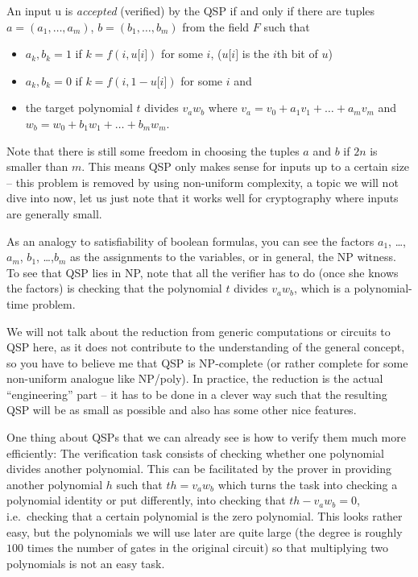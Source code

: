 \documentclass[11pt,letterpaper]{article}
\begin{document}
An input u is \textit{accepted} (verified) by the QSP if and only if there are tuples $a = (a_{1}, \dots,a_{m})$, $b = (b_{1}, \dots,b_{m})$ from the field $F$ such that
\begin{itemize}
\item  $a_{k},b_{k} = 1$ if $k = f(i, u\lbrack i\rbrack)$ for some $i$, ($u\lbrack i\rbrack$ is the $i$th bit of $u$)
\item  $a_{k},b_{k} = 0$ if $k = f(i, 1 - u\lbrack i\rbrack)$ for some $i$ and
\item the target polynomial $t$ divides $v_{a} w_{b}$ where $v_{a} = v_{0} + a_{1} v_{1} +  \dots  + a_{m}v_{m}$ and $w_{b} = w_{0} + b_{1} w_{1} +  \dots  + b_{m}w_{m}$.
\end{itemize}


Note that there is still some freedom in choosing the tuples $a$ and $b$ if $2n$ is smaller than $m$. This means QSP only makes sense for inputs up to a certain size -- this problem is removed by using non-uniform complexity, a topic we will not dive into now, let us just note that it works well for cryptography where inputs are generally small.


As an analogy to satisfiability of boolean formulas, you can see the factors $a_{1}$, \dots,$a_{m}$, $b_{1}$, \dots,$b_{m}$ as the assignments to the variables, or in general, the NP witness. To see that QSP lies in NP, note that all the verifier has to do (once she knows the factors) is checking that the polynomial $t$ divides $v_{a} w_{b}$, which is a polynomial-time problem.

We will not talk about the reduction from generic computations or circuits to QSP here, as it does not contribute to the understanding of the general concept, so you have to believe me that QSP is NP-complete (or rather complete for some non-uniform analogue like NP/poly). In practice, the reduction is the actual ``engineering'' part -- it has to be done in a clever way such that the resulting QSP will be as small as possible and also has some other nice features.


One thing about QSPs that we can already see is how to verify them much more efficiently: The verification task consists of checking whether one polynomial divides another polynomial. This can be facilitated by the prover in providing another polynomial $h$ such that $t h = v_{a} w_{b}$ which turns the task into checking a polynomial identity or put differently, into checking that $t h - v_{a} w_{b} = 0$, i.e.\ checking that a certain polynomial is the zero polynomial. This looks rather easy, but the polynomials we will use later are quite large (the degree is roughly $100$ times the number of gates in the original circuit) so that multiplying two polynomials is not an easy task.
\end{document}
